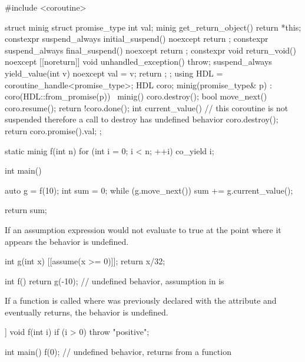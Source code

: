 \pnum
\begin{example}
\begin{codeblock}
#include <coroutine>

struct minig {
  struct promise_type {
    int val;
    minig get_return_object() { return {*this}; }
    constexpr suspend_always initial_suspend() noexcept { return {}; }
    constexpr suspend_always final_suspend() noexcept { return {}; }
    constexpr void return_void() noexcept {}
    [[noreturn]] void unhandled_exception() { throw; }
    suspend_always yield_value(int v) noexcept {
      val = v;
      return {};
    }
  };
  using HDL = coroutine_handle<promise_type>;
  HDL coro;
  minig(promise_type& p) : coro(HDL::from_promise(p)) {}
  ~minig() { coro.destroy(); }
  bool move_next() {
    coro.resume();
    return !coro.done();
  }
  int current_value() {
    // this coroutine is not suspended therefore a call to destroy has undefined behavior
    coro.destroy();
    return coro.promise().val;
  }
};

static minig f(int n) {
  for (int i = 0; i < n; ++i)
    co_yield i;
}

int main() {
  auto g = f(10);
  int sum = 0;
  while (g.move_next())
    sum += g.current_value();

  return sum;
}
\end{codeblock}
\end{example}


\pnum
If an assumption expression would not evaluate to true at the point where it
appears the behavior is undefined.

\pnum
\begin{example}
\begin{codeblock}
int g(int x) {
  [[assume(x >= 0)]];
  return x/32;
}

int f() {
  return g(-10);    // undefined behavior, assumption in  is 
}
\end{codeblock}
\end{example}


\pnum
If a function  is called
where  was previously declared
with the  attribute and
 eventually returns,
the behavior is undefined.

\pnum
\begin{example}
\begin{codeblock}
[[noreturn]] void f(int i) {
  if (i > 0)
    throw "positive";
}

int main() {
  f(0);         // undefined behavior, returns from a \tcode{[[noreturn]]} function
}
\end{codeblock}
\end{example}

